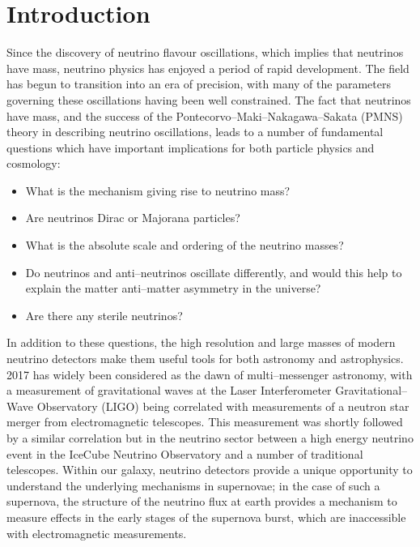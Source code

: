\chapter{\label{ch:intro}Introduction} 

\minitoc

Since the discovery of neutrino flavour oscillations, which implies that
neutrinos have mass, neutrino physics has enjoyed a period of rapid development.
The field has begun to transition into an era of precision, with many of the
parameters governing these oscillations having been well constrained. The fact
that neutrinos have mass, and the success of the
Pontecorvo--Maki--Nakagawa--Sakata (PMNS) theory in describing neutrino 
oscillations, leads to a number of fundamental questions which have important 
implications for both particle physics and cosmology: 
\begin{itemize}
	\item What is the mechanism giving rise to neutrino mass? 
	\item Are neutrinos Dirac or Majorana particles?
	\item What is the absolute scale and ordering of the neutrino masses?
	\item Do neutrinos and anti--neutrinos oscillate differently, and would this 
	      help to explain the matter anti--matter asymmetry in the universe?
	\item Are there any sterile neutrinos?
\end{itemize}

In addition to these questions, the high resolution and large masses of modern 
neutrino detectors make them useful tools for both astronomy and astrophysics. 
2017 has widely been considered as the dawn of multi--messenger astronomy, 
with a measurement of gravitational waves at the Laser Interferometer 
Gravitational--Wave Observatory (LIGO) being correlated with measurements of a 
neutron star merger from electromagnetic telescopes\cite{Abbott2017}.  This 
measurement was shortly followed by a similar correlation but in the neutrino 
sector between a high energy neutrino event in the IceCube Neutrino 
Observatory and a number of traditional telescopes\cite{Aartsen2018}.  Within 
our galaxy, neutrino detectors provide a unique opportunity to understand the 
underlying mechanisms in supernovae; in the case of such a supernova, the 
structure of the neutrino flux at earth provides a mechanism to measure 
effects in the early stages of the supernova burst, which are inaccessible 
with electromagnetic measurements\cite{Scholberg:2012id}.

